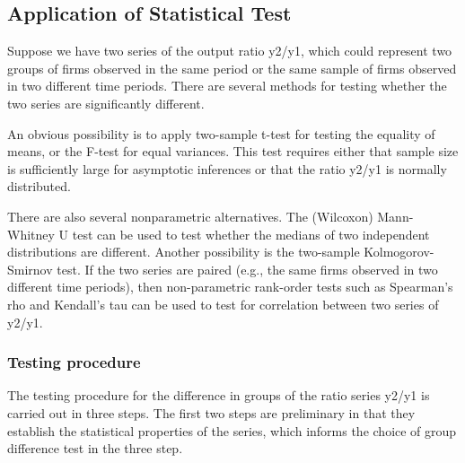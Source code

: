 \documentclass[
  10pt,
]{article}
\begin{document}
\hypertarget{application-of-statistical-test}{%
\subsection{Application of Statistical
Test}\label{application-of-statistical-test}}

Suppose we have two series of the output ratio y2/y1, which could
represent two groups of firms observed in the same period or the same
sample of firms observed in two different time periods. There are
several methods for testing whether the two series are significantly
different.

An obvious possibility is to apply two-sample t-test for testing the
equality of means, or the F-test for equal variances. This test requires
either that sample size is sufficiently large for asymptotic inferences
or that the ratio y2/y1 is normally distributed.

There are also several nonparametric alternatives. The (Wilcoxon)
Mann-Whitney U test can be used to test whether the medians of two
independent distributions are different. Another possibility is the
two-sample Kolmogorov-Smirnov test. If the two series are paired (e.g.,
the same firms observed in two different time periods), then
non-parametric rank-order tests such as Spearman's rho and Kendall's tau
can be used to test for correlation between two series of y2/y1.

\hypertarget{TestSteps}{%
\subsubsection{Testing procedure}\label{TestSteps}}

The testing procedure for the difference in groups of the ratio series
y2/y1 is carried out in three steps. The first two steps are preliminary
in that they establish the statistical properties of the series, which
informs the choice of group difference test in the three step.
\end{document}
